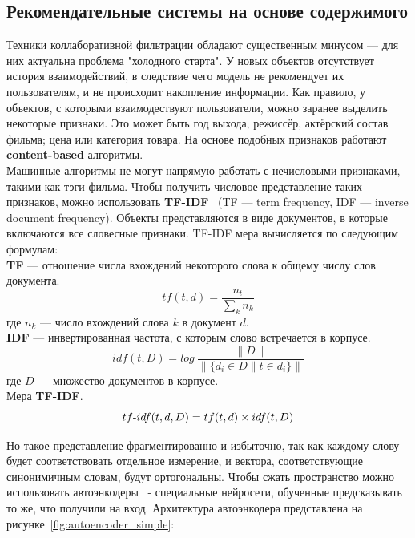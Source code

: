 \subsection{Рекомендательные системы на основе содержимого}\label{subsec:content_rec_systems}
Техники коллаборативной фильтрации обладают существенным минусом --- для них актуальна проблема "холодного старта".
У новых объектов отсутствует история взаимодействий, в следствие чего модель не рекомендует их пользователям, и не происходит накопление информации.
Как правило, у объектов, с которыми взаимодествуют пользователи, можно заранее выделить некоторые признаки.
Это может быть год выхода, режиссёр, актёрский состав фильма; цена или категория товара.
На основе подобных признаков работают \textbf{content-based} алгоритмы.
\\Машинные алгоритмы не могут напрямую работать с нечисловыми признаками, такими как тэги фильма.
Чтобы получить числовое представление таких признаков, можно использовать \textbf{TF-IDF}~\cite{tfidf} (TF — term frequency, IDF — inverse document frequency).
Объекты представляются в виде документов, в которые включаются все словесные признаки.
TF-IDF мера вычисляется по следующим формулам:
\\\textbf{TF} --- отношение числа вхождений некоторого слова к общему числу слов документа.
\begin{equation}\label{eq:tf}
        tf(t, d) = \frac{n_{t}}{\sum_{k}{n_{k}}}
\end{equation}
где $n_{k}$ --- число вхождений слова $k$ в документ $d$.
\\\textbf{IDF} --- инвертированная частота, с которым слово встречается в корпусе.
\begin{equation}\label{eq:idf}
        idf(t, D) = log~\frac{\|D\|}{\|\{d_{i} \in D \| t \in d_{i}\}\|}
\end{equation}
где $D$ --- множество документов в корпусе.
\\Мера \textbf{TF-IDF}.
\begin{equation}\label{eq:tf-idf}
        tf\textnormal{-}idf(t, d, D) = tf(t, d) \times idf(t, D)
\end{equation}

Но такое представление фрагментированно и избыточно, так как каждому слову будет соответствовать отдельное измерение, и вектора, соответствующие синонимичным словам, будут ортогональны.
Чтобы сжать пространство можно использовать автоэнкодеры~\cite{autoencoders} - специальные нейросети, обученные предсказывать то же, что получили на вход.
Архитектура автоэнкодера представлена на рисунке~\ref{fig:autoencoder_simple}:

